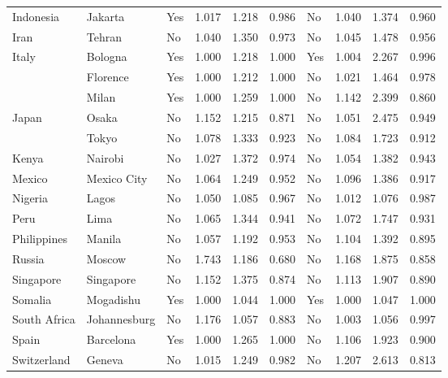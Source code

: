 \documentclass[Afour,sageh,times]{sagej}
\begin{document}
\begin{table}[htbp]
\begin{tabular}{ l l l r r r l r r r }
Indonesia    & Jakarta       &      Yes &  1.017 &  1.218 &  0.986 &       No &  1.040 &  1.374 &  0.960 \\
Iran         & Tehran        &       No &  1.040 &  1.350 &  0.973 &       No &  1.045 &  1.478 &  0.956 \\
Italy        & Bologna       &      Yes &  1.000 &  1.218 &  1.000 &      Yes &  1.004 &  2.267 &  0.996 \\
             & Florence      &      Yes &  1.000 &  1.212 &  1.000 &       No &  1.021 &  1.464 &  0.978 \\
             & Milan         &      Yes &  1.000 &  1.259 &  1.000 &       No &  1.142 &  2.399 &  0.860 \\
Japan        & Osaka         &       No &  1.152 &  1.215 &  0.871 &       No &  1.051 &  2.475 &  0.949 \\
             & Tokyo         &       No &  1.078 &  1.333 &  0.923 &       No &  1.084 &  1.723 &  0.912 \\
Kenya        & Nairobi       &       No &  1.027 &  1.372 &  0.974 &       No &  1.054 &  1.382 &  0.943 \\
Mexico       & Mexico City   &       No &  1.064 &  1.249 &  0.952 &       No &  1.096 &  1.386 &  0.917 \\
Nigeria      & Lagos         &       No &  1.050 &  1.085 &  0.967 &       No &  1.012 &  1.076 &  0.987 \\
Peru         & Lima          &       No &  1.065 &  1.344 &  0.941 &       No &  1.072 &  1.747 &  0.931 \\
Philippines  & Manila        &       No &  1.057 &  1.192 &  0.953 &       No &  1.104 &  1.392 &  0.895 \\
Russia       & Moscow        &       No &  1.743 &  1.186 &  0.680 &       No &  1.168 &  1.875 &  0.858 \\
Singapore    & Singapore     &       No &  1.152 &  1.375 &  0.874 &       No &  1.113 &  1.907 &  0.890 \\
Somalia      & Mogadishu     &      Yes &  1.000 &  1.044 &  1.000 &      Yes &  1.000 &  1.047 &  1.000 \\
South Africa & Johannesburg  &       No &  1.176 &  1.057 &  0.883 &       No &  1.003 &  1.056 &  0.997 \\
Spain        & Barcelona     &      Yes &  1.000 &  1.265 &  1.000 &       No &  1.106 &  1.923 &  0.900 \\
Switzerland  & Geneva        &       No &  1.015 &  1.249 &  0.982 &       No &  1.207 &  2.613 &  0.813 \\

\end{tabular}
\end{table}
\end{document}
